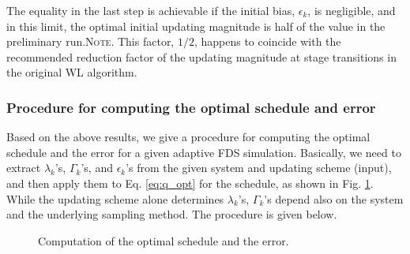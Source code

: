 \documentclass[reprint, superscriptaddress, floatfix]{revtex4-1}
\newcommand{\note}[1]{{\color{DarkGreen}\footnotesize \textsc{Note.} #1}}
\begin{document}
%
%
The equality in the last step is achievable
if the initial bias, $\epsilon_k$, is negligible,
and in this limit, the optimal initial updating magnitude
is half of the value
in the preliminary run.\note{This factor, $1/2$,
  happens to coincide with the
  recommended reduction factor of the updating magnitude
  at stage transitions
  in the original WL algorithm\cite{
  wang2001, wang2001pre}.  }%



\subsubsection{\label{sec:procedure}
Procedure for computing the optimal schedule and error
}



Based on the above results,
we give a procedure for computing
the optimal schedule and the error
for a given adaptive FDS simulation.
%
Basically, we need to extract
$\lambda_k$'s, $\Gamma_k$'s, and $\epsilon_k$'s
from the given system and updating scheme (input),
and then apply them to Eq. \eqref{eq:q_opt}
for the schedule,
as shown in Fig. \ref{fig:vardep}.
%
While the updating scheme alone
determines $\lambda_k$'s,
$\Gamma_k$'s depend also on the system
and the underlying sampling method.
%
The procedure is given below.

\begin{figure}[h]\centering
  \caption{
    \label{fig:vardep}
    Computation of the optimal schedule and the error.
  }
\end{figure}
\end{document}
